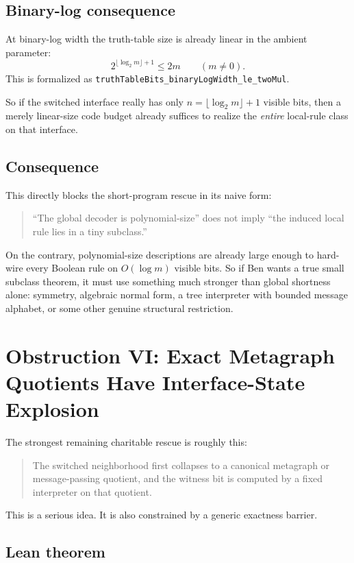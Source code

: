 \documentclass[11pt]{article}
\theoremstyle{remark}
\begin{document}
\subsection{Binary-log consequence}

At binary-log width the truth-table size is already linear in the ambient parameter:
\[
  2^{\lfloor \log_2 m \rfloor + 1} \le 2m \qquad (m \ne 0).
\]
This is formalized as
\texttt{truthTableBits\_binaryLogWidth\_le\_twoMul}.

So if the switched interface really has only \(n = \lfloor \log_2 m \rfloor + 1\) visible bits,
then a merely linear-size code budget already suffices to realize the \emph{entire} local-rule
class on that interface.

\subsection{Consequence}

This directly blocks the short-program rescue in its naive form:

\begin{quote}
``The global decoder is polynomial-size'' does not imply
``the induced local rule lies in a tiny subclass.''
\end{quote}

On the contrary, polynomial-size descriptions are already large enough to hard-wire every Boolean
rule on \(O(\log m)\) visible bits.  So if Ben wants a true small subclass theorem, it must use
something much stronger than global shortness alone: symmetry, algebraic normal form, a tree
interpreter with bounded message alphabet, or some other genuine structural restriction.

\section{Obstruction VI: Exact Metagraph Quotients Have Interface-State Explosion}

The strongest remaining charitable rescue is roughly this:
\begin{quote}
The switched neighborhood first collapses to a canonical metagraph or message-passing quotient,
and the witness bit is computed by a fixed interpreter on that quotient.
\end{quote}

This is a serious idea.  It is also constrained by a generic exactness barrier.

\subsection{Lean theorem}
\end{document}
